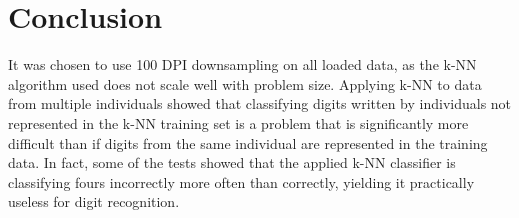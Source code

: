 \section{Conclusion}
\label{sec:conclusion}
It was chosen to use 100 DPI downsampling on all loaded data,
as the k-NN algorithm used does not scale well with problem size.
Applying k-NN to data from multiple individuals showed that
classifying digits written by individuals not represented
in the k-NN training set is a problem that is significantly
more difficult than if digits from the same individual are
represented in the training data.
In fact, some of the tests showed that the applied k-NN classifier
is classifying fours incorrectly more often than correctly,
yielding it practically useless for digit recognition.